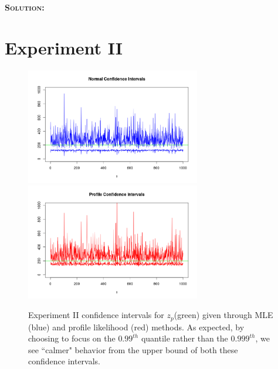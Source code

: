 \documentclass[12pt,oneside]{article}
\newenvironment{solution}
    {\textbf{\textsc{Solution:}}\\}
    {\newpage}
\begin{document}
\begin{solution}
\section*{Experiment II}
\begin{figure}[H]
\begin{center}
{\includegraphics[width=3in]{Assignments/a2/e2-nci.png}}
{\includegraphics[width=3in]{Assignments/a2/e2-pllci.png}}
\caption{Experiment II confidence intervals for $z_p$(green) given through MLE (blue) and profile likelihood (red) methods. As expected, by choosing to focus on the $0.99^{th}$ quantile rather than the $0.999^{th}$, we see ``calmer" behavior from the upper bound of both these confidence intervals.}

\end{center}
\end{figure}



\end{solution}
\end{document}
